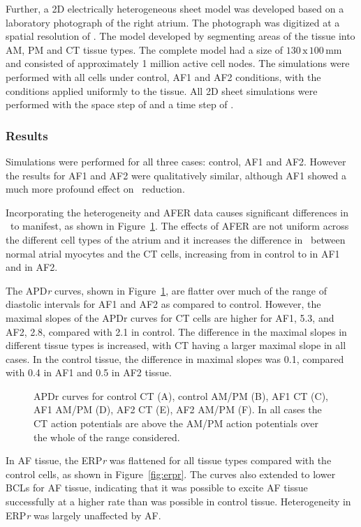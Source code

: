 Further, a 2D electrically heterogeneous sheet model was developed based on a
laboratory photograph of the right atrium.  The photograph was digitized at a
spatial resolution of . The model developed by segmenting areas of the
tissue into AM, PM and CT tissue types.  The complete model had a size of
$130\,\text{x}\,100\,\text{mm}$ and consisted of approximately 1 million active cell nodes.  The
simulations were performed with all cells under control, AF1 and AF2 conditions,
with the conditions applied uniformly to the tissue.  All 2D sheet simulations
were performed with the space step of  and a time step of .

\subsubsection{Results}

Simulations were performed for all three cases: control, AF1 and AF2.
However the results for AF1 and AF2 were qualitatively similar, although
AF1 showed a much more profound effect on \apd\ reduction.

Incorporating the heterogeneity and AFER data causes significant
differences in \apd\ to manifest, as shown in Figure~\ref{fig:apdr}. The
effects of AFER are not uniform across the different cell types of the
atrium and it increases the difference in \apd\ between normal atrial
myocytes and the CT cells, increasing from  in control to 
in AF1 and  in AF2.

The APD\emph{r} curves, shown in Figure~\ref{fig:apdr}, are flatter over much
of the range of diastolic intervals for AF1 and AF2 as compared to
control.  However, the maximal slopes
of the APDr curves for CT cells are higher for AF1, 5.3, and AF2, 2.8,
compared with 2.1 in control.  The difference in the maximal slopes in
different tissue types is increased, with CT having a larger maximal
slope in all cases.  In the control tissue, the difference in maximal
slopes was 0.1, compared with 0.4 in AF1 and 0.5 in AF2 tissue.

\begin{figure}[tb]
\centering
\caption{APDr curves for control CT (A), control AM/PM (B), AF1 CT (C),
AF1 AM/PM (D), AF2 CT (E), AF2 AM/PM (F). In all cases the CT action
potentials are above the AM/PM action potentials over the whole of the
range considered.}
\label{fig:apdr}
\end{figure}

In AF tissue, the ERP\emph{r} was flattened for all tissue types compared with
the control cells, as shown in Figure~\ref{fig:erpr}.  The curves also extended
to lower BCLs for AF tissue, indicating that it was possible to excite AF tissue
successfully at a higher rate than was possible in control tissue.
Heterogeneity in ERP\emph{r} was largely unaffected by AF.

